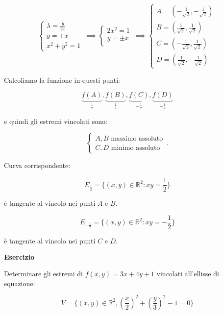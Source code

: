 \documentclass[../appunti-analisi.tex]{subfiles}
\begin{document}
\[
        \begin{cases}
               \lambda= \frac{y}{2x}\\
               y= \pm x\\
               x^{2}+ y^{2}= 1
        \end{cases}\, \implies
        \begin{cases}
               2x^{2}=1\\
               y= \pm x\\
        \end{cases}\, \implies
        \begin{cases}
               A=( - \frac{1}{\sqrt{2}}, - \frac{1}{\sqrt{2}})\\
               B= ( \frac{1}{\sqrt{2}}, \frac{1}{\sqrt{2}})\\
               C=( - \frac{1}{\sqrt{2}},  \frac{1}{\sqrt{2}})\\
               D=(  \frac{1}{\sqrt{2}}, - \frac{1}{\sqrt{2}})
        \end{cases}\, 
\]

Calcoliamo la funzione in questi punti:

\[
    \underbrace{f(A)}_\text{$\frac{1}{2}$},\underbrace{f(B)}_\text{$\frac{1}{2}$},\underbrace{f(C)}_\text{$-\frac{1}{2}$},\underbrace{f(D)}_\text{$- \frac{1}{2}$}
\]

e quindi gli estremi vincolati sono:

\[
        \begin{cases}
            A,B \text{ massimo assoluto}\\
            C,D \text{ minimo assoluto}
        \end{cases}\,.
\]

Curva corrispondente:

\[
    E_{ \frac{1}{2}} = \{(x,y) \in \mathbb{R}^{2}: xy= \frac{1}{2}\}
\]

è tangente al vincolo nei punti $A$ e $B$.

\[
    E_{ -\frac{1}{2}} = \{(x,y) \in \mathbb{R}^{2}: xy=- \frac{1}{2}\}
\]

è tangente al vincolo nei punti $C$ e $D$.

\newpage

\textbf{Esercizio} 

Determinare gli estremi di $f(x,y) = 3x + 4y +1$ vincolati all'ellisse di equazione:

\[
    V= \{(x,y) \in \mathbb{R}^{2}, (\frac{x}{2})^{2}+ (\frac{y}{3})^{2}-1=0\}
\]
\end{document}
